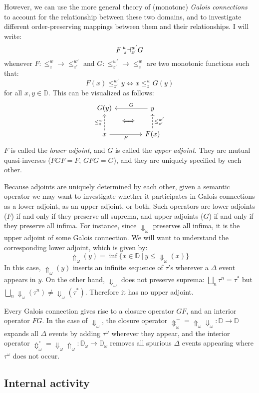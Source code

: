 \documentclass[11pt]{article}
\begin{document}
However,
we can use the more general theory of (monotone) \emph{Galois connections}
to account for the relationship between these two domains,
and to investigate different order-preserving mappings between them
and their relationships.
I will write:
\[
    F \prescript{w}{z}\dashv^{w'}_{z'} G
\]
whenever
$F : {\le^w_z} \rightarrow {\le^{w'}_{z'}}$ and
$G : {\le^{w'}_{z'}} \rightarrow {\le^w_z}$
are two monotonic functions such that:
\[
    F(x) \le^{w'}_{z'} y \Leftrightarrow x \le^w_z G(y)
\]
for all $x, y \in \mathbb{D}$.
This can be visualized as follows:
\[
  \begin{tikzcd}[row sep=tiny, column sep=tiny]
    G(y) &  & y \arrow[ll, "G"'] \\
    & \Longleftrightarrow & \\
    x \arrow[uu, dashed, "\le^w_z"] \arrow[rr, "F"'] & &
    F(x) \arrow[uu, dashed, "\le^{w'}_{z'}"']
  \end{tikzcd}
\]
$F$ is called the \emph{lower adjoint}, and
$G$ is called the \emph{upper adjoint}.
They are mutual quasi-inverses ($FGF = F$, $GFG = G$),
and they are uniquely specified by each other.

Because adjoints are uniquely determined by each other,
given a semantic operator
we may want to investigate whether it participates
in Galois connections as a lower adjoint, as an upper adjoint, or both.
Such operators are
lower adjoints ($F$) if and only if they preserve all suprema, and
upper adjoints ($G$) if and only if they preserve all infima.
For instance, since $\Downarrow_\omega$ preserves all infima,
it is the upper adjoint of some Galois connection.
We will want to understand the corresponding lower adjoint,
which is given by:
\[
    {\Uparrow_\omega}(y) =
      \inf \{ x \in \mathbb{D} \:|\: y \le {\Downarrow_\omega}(x) \}
\]
In this case,
${\Uparrow}_\omega(y)$ inserts an infinite sequence of $\tau$'s
wherever a $\Delta$ event appears in $y$.
On the other hand,
$\Downarrow_\omega$ does not preserve suprema:
$\bigsqcup_n \tau^n = \tau^*$ but
$\bigsqcup_n {\Downarrow}_\omega(\tau^n) \neq {\Downarrow}_\omega(\tau^*)$.
Therefore it has no upper adjoint.

Every Galois connection gives rise to a closure operator $GF$,
and an interior operator $FG$.
In the case of $\Downarrow_\omega$,
the closure operator
${\Updownarrow}_\omega^- =
 {\Uparrow}_\omega {\Downarrow_\omega} :
 \mathbb{D} \rightarrow \mathbb{D}$
expands all $\Delta$ events by adding
$\tau^\omega$ wherever they appear,
and the interior operator
${\Updownarrow}_\omega^\circ =
 {\Downarrow}_\omega {\Uparrow}_\omega :
 \mathbb{D}_\omega \rightarrow \mathbb{D}_\omega$
removes all spurious $\Delta$ events
appearing where $\tau^\omega$ does not occur.


\subsection{Internal activity} %





\end{document}

